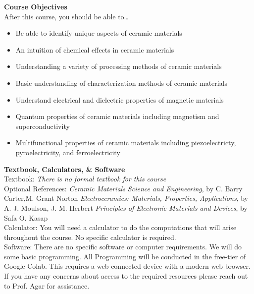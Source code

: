 \documentclass[11pt,letterpaper]{article}
\newcommand{\lefthead}[2]{\noindent\textbf{#1}\hfill\\[#2]}
\begin{document}
\lefthead{Course Objectives}{0.3cm}
After this course, you should be able to\dots
        \begin{itemize}
        \item Be able to identify unique aspects of ceramic materials
        \item An intuition of chemical effects in ceramic materials
        \item Understanding a variety of processing methods of ceramic materials
        \item Basic understanding of characterization methods of ceramic materials
        \item Understand electrical and dielectric properties of magnetic materials
        \item Quantum properties of ceramic materials including magnetism and superconductivity
        \item Multifunctional properties of ceramic materials including piezoelectricty, pyroelectricity, and ferroelectricity
        \end{itemize} \vspace{0.3cm}




\lefthead{Textbook, Calculators, \& Software}{0.3cm}
\noindent Textbook: \emph{There is no formal textbook for this course}\\

\noindent Optional References: \newline \emph{Ceramic Materials
Science and Engineering}, by C. Barry Carter,M. Grant Norton \newline \emph{Electroceramics: Materials, Properties, Applications}, by A. J. Moulson, J. M. Herbert
\newline \emph{Principles of Electronic Materials and Devices}, by Safa O. Kasap\\[0.1cm]

\noindent Calculator: You will need a calculator to do the computations that will arise throughout the course. No specific calculator is required. \\[0.1cm]


\noindent Software: There are no specific software or computer requirements. We will do some basic programming. All Programming will be conducted in the free-tier of Google Colab. This requires a web-connected device with a modern web browser.  \\[0.1cm]


\noindent If you have any concerns about access to the required resources please reach out to Prof. Agar for assistance. 
\\[0.3cm]
\end{document}
